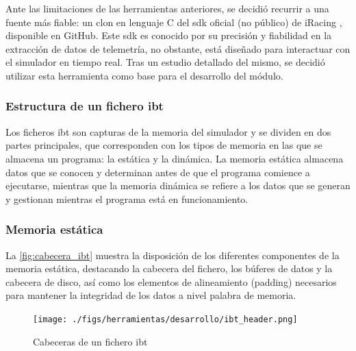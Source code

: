 Ante las limitaciones de las herramientas anteriores, se decidió recurrir a una fuente más fiable: un clon en lenguaje C del \ac{sdk} oficial (no público) de iRacing \cite{irsdk}, disponible en GitHub. Este \ac{sdk}  es conocido por su precisión y fiabilidad en la extracción de datos de telemetría, no obstante, está diseñado para interactuar con el simulador en tiempo real. Tras un estudio detallado del mismo, se decidió utilizar esta herramienta como base para el desarrollo del módulo.

\subsubsection*{Estructura de un fichero \ac{ibt}}

Los ficheros \ac{ibt} son capturas de la memoria del simulador y se dividen en dos partes principales, que corresponden con los tipos de memoria en las que se almacena un programa: la estática y la dinámica. La memoria estática almacena datos que se conocen y determinan antes de que el programa comience a ejecutarse, mientras que la memoria dinámica se refiere a los datos que se generan y gestionan mientras el programa está en funcionamiento.

\subsubsection*{Memoria estática}

La \autoref{fig:cabecera_ibt} muestra la disposición de los diferentes componentes de la memoria estática, destacando la cabecera del fichero, los búferes de datos y la cabecera de disco, así como los elementos de alineamiento (padding) necesarios para mantener la integridad de los datos a nivel palabra de memoria.

\begin{figure}[H]
	\centering
	\texttt{[image: ./figs/herramientas/desarrollo/ibt\_header.png]}
	\caption[Cabeceras de un fichero IBT]{Cabeceras de un fichero \ac{ibt}}
    \label{fig:cabecera_ibt}
\end{figure}

